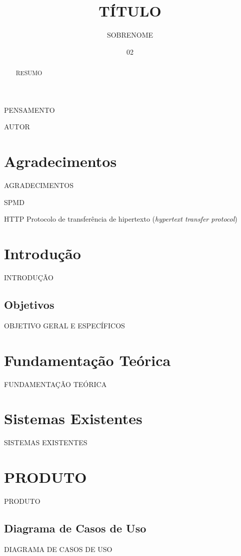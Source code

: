 \documentclass[oneside]{ifrs}
\author{SOBRENOME}{NOME}
\title{TÍTULO}
\date{02}{junho}{2021} %
\begin{document}
\maketitle

\epigraph{PENSAMENTO}{AUTOR}

\chapter*{Agradecimentos}
AGRADECIMENTOS

\begin{abstract}
RESUMO
\end{abstract}

\begin{listofabbrv}{SPMD}
	\item[HTTP]Protocolo de transferência de hipertexto (\textit{hypertext transfer protocol})
\end{listofabbrv}

\listoffigures

\listoftables

\tableofcontents

\chapter{Introdução}
INTRODUÇÃO

\section{Objetivos}
OBJETIVO GERAL E ESPECÍFICOS

\chapter{Fundamentação Teórica}
FUNDAMENTAÇÃO TEÓRICA

\chapter{Sistemas Existentes}
SISTEMAS EXISTENTES

\chapter{PRODUTO}
PRODUTO

\section{Diagrama de Casos de Uso}
DIAGRAMA DE CASOS DE USO
\end{document}
